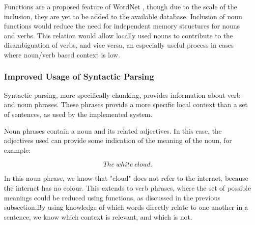 \documentclass[]{article}
\begin{document}
Functions are a proposed feature of WordNet \cite{WN2Nouns}, though due to the scale of the inclusion, they are yet to be added to the available database. Inclusion of noun functions would reduce the need for independent memory structures for nouns and verbs. This relation would allow locally used nouns to contribute to the disambiguation of verbs, and vice versa, an especially useful process in cases where noun/verb based context is low.

\subsubsection{Improved Usage of Syntactic Parsing}
\label{sec:FutureSyntactic}
Syntactic parsing, more specifically chunking, provides information about verb and noun phrases. These phrases provide a more specific local context than a set of sentences, as used by the implemented system. 

Noun phrases contain a noun and its related adjectives. In this case, the adjectives used can provide some indication of the meaning of the noun, for example:

\[The\: white\: cloud.\]

In this noun phrase, we know that "cloud" does not refer to the internet, because the internet has no colour. This extends to verb phrases, where the set of possible meanings could be reduced using functions, as discussed in the previous subsection.By using knowledge of which words directly relate to one another in a sentence, we know which context is relevant, and which is not.



\newpage



\newpage
\appendix
\end{document}
